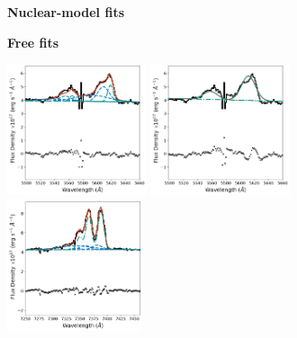 \begin{figure}\ContinuedFloat
    \centering
    \begin{subfigure}[t]{0.9\linewidth}
        \begin{minipage}{0.48\linewidth}
            \centering
            \textbf{Nuclear-model fits}
        \end{minipage}
        \hfill
        \begin{minipage}{0.42\linewidth}
            \centering
            \textbf{Free fits}
        \end{minipage}
        \vfill
        \includegraphics[width=0.45\textwidth]{figures/muse_f13451_1232/line_fits/ap4_oiii.png}
        \hfill
        \includegraphics[width=0.45\textwidth]{figures/muse_f13451_1232/line_fits/ap4_oiii_no_nuclear_model.png}
        \vfill
        \includegraphics[width=0.435\textwidth]{figures/muse_f13451_1232/line_fits/ap4_halpha.png}

\end{subfigure}
\end{figure}
